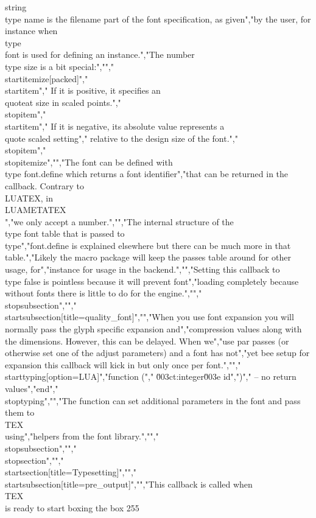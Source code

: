 string \\type {name} is the filename part of the font specification, as given","by the user, for instance when \\type {\\font} is used for defining an instance.","The number \\type {size} is a bit special:","","\\startitemize[packed]","\\startitem","    If it is positive, it specifies an \\quote{at size} in scaled points.","\\stopitem","\\startitem","    If it is negative, its absolute value represents a \\quote {scaled} setting","    relative to the design size of the font.","\\stopitem","\\stopitemize","","The font can be defined with \\type {font.define} which returns a font identifier","that can be returned in the callback. Contrary to \\LUATEX, in \\LUAMETATEX\\","we only accept a number.","","The internal structure of the \\type {font} table that is passed to \\type","{font.define} is explained elsewhere but there can be much more in that table.","Likely the macro package will keep the passes table around for other usage, for","instance for usage in the backend.","","Setting this callback to \\type {false} is pointless because it will prevent font","loading completely because without fonts there is little to do for the engine.","","\\stopsubsection","","\\startsubsection[title=quality_font]","","When you use font expansion you will normally pass the glyph specific expansion and","compression values along with the dimensions. However, this can be delayed. When we","use par passes (or otherwise set one of the adjust parameters) and a font has not","yet bee setup for expansion this callback will kick in but only once per font.","","\\starttyping[option=LUA]","function (","    \u003ct:integer\u003e id",")","    -- no return values","end","\\stoptyping","","The function can set additional parameters in the font and pass them to \\TEX\\ using","helpers from the font library.","","\\stopsubsection","","\\stopsection","","\\startsection[title=Typesetting]","","\\startsubsection[title=pre_output]","","This callback is called when \\TEX\\ is ready to start boxing the box 255 